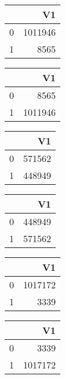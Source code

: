 \bigskip\bigskip
\centering
\begin{tabular}{rr}
  \hline
 & V1 \\ 
  \hline
0 & 1011946 \\ 
  1 & 8565 \\ 
   \hline
\end{tabular}

\bigskip\bigskip
\centering
\begin{tabular}{rr}
  \hline
 & V1 \\ 
  \hline
0 & 8565 \\ 
  1 & 1011946 \\ 
   \hline
\end{tabular}

\bigskip\bigskip
\centering
\begin{tabular}{rr}
  \hline
 & V1 \\ 
  \hline
0 & 571562 \\ 
  1 & 448949 \\ 
   \hline
\end{tabular}

\bigskip\bigskip
\centering
\begin{tabular}{rr}
  \hline
 & V1 \\ 
  \hline
0 & 448949 \\ 
  1 & 571562 \\ 
   \hline
\end{tabular}

\bigskip\bigskip
\centering
\begin{tabular}{rr}
  \hline
 & V1 \\ 
  \hline
0 & 1017172 \\ 
  1 & 3339 \\ 
   \hline
\end{tabular}

\bigskip\bigskip
\centering
\begin{tabular}{rr}
  \hline
 & V1 \\ 
  \hline
0 & 3339 \\ 
  1 & 1017172 \\ 
   \hline
\end{tabular}

